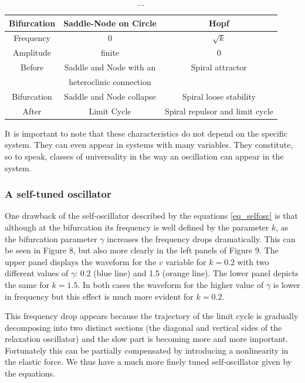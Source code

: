 \documentclass{article}
\begin{document}
\begin{table}[h!]
\begin{center}
\begin{tabular}{ |c|c|c| }
 \hline
 Bifurcation & Saddle-Node on Circle & Hopf \\ 
 \hline
 \hline
 Frequency & 0 &  $\sqrt{k}$ \\
 \hline
 Amplitude & finite & 0 \\ 
 \hline
 Before & Saddle and Node with an & Spiral attractor \\ 
 & heteroclinic connection & \\
 \hline
 Bifurcation & Saddle and Node collapse & Spiral loose stability \\ 
 \hline
 After & Limit Cycle & Spiral repulsor and limit cycle\\
 \hline
\end{tabular}
\caption{...}
\end{center}
\end{table}

It is important to note that these characteristics do not depend on the specific system. 
They can even appear in systems with many variables. 
They constitute, so to speak, classes of universality in the way an oscillation can appear in the system.



\subsubsection{A self-tuned oscillator}

One drawback of the self-oscillator described by the equations \ref{eq_selfosc} is that although at the bifurcation its frequency is well defined by the parameter $k$, as the bifurcation parameter $\gamma$ increases the frequency drops dramatically. 
This can be seen in Figure 8, but also more clearly in the left panels of Figure 9. 
The upper panel displays the waveform for the $v$ variable for $k=0.2$ with two different values of $\gamma$: 0.2 (blue line) and 1.5 (orange line). 
The lower panel depicts the same for $k=1.5$. 
In both cases the waveform for the higher value of $\gamma$ is lower in frequency but this effect is much more evident for $k=0.2$.

This frequency drop appears because the trajectory of the limit cycle is gradually decomposing into two distinct sections (the diagonal and vertical sides of the relaxation oscillator) and the slow part is becoming more and more important. 
Fortunately this can be partially compensated by introducing a nonlinearity in the elastic force. 
We thus have a much more finely tuned self-oscillator given by the equations.
\end{document}
